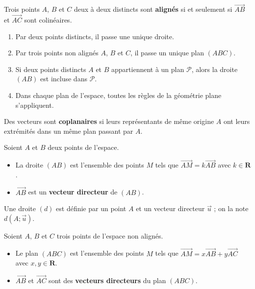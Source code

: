 \documentclass[11pt,a4paper,openany]{book}
\theoremstyle{definition}
\newcommand{\vc}[1]{\overrightarrow{#1}}
\begin{document}
    \begin{Propriété}
        Trois points $A$, $B$ et $C$ deux à deux distincts sont \textbf{alignés} si et
        seulement si $\vc{AB}$ et $\vc{AC}$ sont colinéaires.
    \end{Propriété}

    \begin{Propriété}
        \begin{enumerate}
            \item Par deux points distincts, il passe une unique droite.
            \item Par trois points non alignés $A$, $B$ et $C$, il passe un unique plan $(ABC)$.
            \item Si deux points distincts $A$ et $B$ appartiennent à un plan $\mathcal{P}$,
                  alors la droite $(AB)$ est incluse dans $\mathcal{P}$.
            \item Dans chaque plan de l'espace, toutes les règles de la géométrie plane
                  s'appliquent.
        \end{enumerate}
    \end{Propriété}

    \begin{Définition}
        Des vecteurs sont \textbf{coplanaires} si leurs représentants de même origine $A$ ont
        leurs extrémités dans un même plan passant par $A$.
    \end{Définition}

    \begin{Définition}
        Soient $A$ et $B$ deux points de l'espace.
        \begin{itemize}
            \item La droite $(AB)$ est l'ensemble des points $M$ tels que
                  $\vc{AM}=k\vc{AB}$ avec $k\in\mathbf{R}$.
            \item $\vc{AB}$ est un \textbf{vecteur directeur} de $(AB)$.
        \end{itemize}
    \end{Définition}

    \begin{Propriété}
        Une droite $(d)$ est définie par un point $A$ et un vecteur directeur $\vc{u}$ ;
        on la note $d(A;\vc{u})$.
    \end{Propriété}

    \begin{Définition}
        Soient $A$, $B$ et $C$ trois points de l'espace non alignés.
        \begin{itemize}
            \item Le plan $(ABC)$ est l'ensemble des points $M$ tels que
                  $\vc{AM}=x\vc{AB}+y\vc{AC}$ avec $x,y\in\mathbf{R}$.
            \item $\vc{AB}$ et $\vc{AC}$ sont des \textbf{vecteurs directeurs} du plan $(ABC)$.
        \end{itemize}
    \end{Définition}
\end{document}

